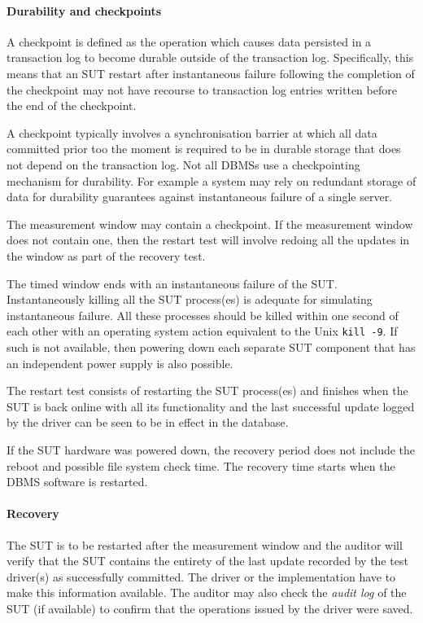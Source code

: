 \paragraph{Durability and checkpoints}

A checkpoint is defined as the operation which causes data persisted in a transaction log to become durable outside of the transaction log. Specifically, this means that an SUT restart after instantaneous failure following the completion of the checkpoint may not have recourse to transaction log entries written before the end of the checkpoint.

A checkpoint typically involves a synchronisation barrier at which all data committed prior too the moment is required to be in durable storage that does not depend on the transaction log.
Not all DBMSs use a checkpointing mechanism for durability. For example a system may rely on redundant storage of data for durability guarantees against instantaneous failure of a single server.

The measurement window may contain a checkpoint. If the measurement window does not contain one, then the restart test will involve redoing all the updates in the window as part of the recovery test.

The timed window ends with an instantaneous failure of the SUT. Instantaneously killing all the SUT process(es) is adequate for simulating instantaneous failure. All these processes should be killed within one second of each other with an operating system action equivalent to the Unix \verb+kill -9+. If such is not available, then powering down each separate SUT component that has an independent power supply is also possible.

The restart test consists of restarting the SUT process(es) and finishes when the SUT is back online with all its functionality and the last successful update logged by the driver can be seen to be in effect in the database.

If the SUT hardware was powered down, the recovery period does not include the reboot and possible file system check time. The recovery time starts when the DBMS software is restarted.




\paragraph{Recovery} 
The SUT is to be restarted after the measurement window and the auditor will verify that the SUT contains the entirety of the last update recorded by the test driver(s) as successfully committed. The driver or the implementation have to make this information available. The auditor may also check the \emph{audit log} of the SUT (if available) to confirm that the operations issued by the driver were saved.


